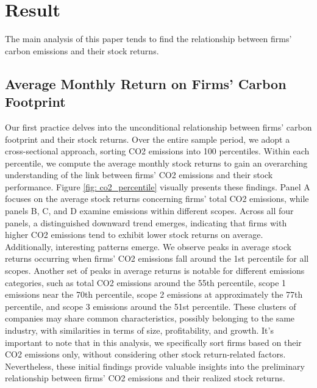 \documentclass[12pt]{article}
\begin{document}
\section{Result} \label{sec:result}
The main analysis of this paper tends to find the relationship between firms' carbon emissions and their stock returns. 
\subsection{Average Monthly Return on Firms' Carbon Footprint}

Our first practice delves into the unconditional relationship between firms' carbon footprint and their stock returns. Over the entire sample period, we adopt a cross-sectional approach, sorting CO2 emissions into 100 percentiles. Within each percentile, we compute the average monthly stock returns to gain an overarching understanding of the link between firms' CO2 emissions and their stock performance. Figure \ref{fig: co2_percentile} visually presents these findings. Panel A focuses on the average stock returns concerning firms' total CO2 emissions, while panels B, C, and D examine emissions within different scopes. Across all four panels, a distinguished downward trend emerges, indicating that firms with higher CO2 emissions tend to exhibit lower stock returns on average. Additionally, interesting patterns emerge. We observe peaks in average stock returns occurring when firms' CO2 emissions fall around the 1st percentile for all scopes. Another set of peaks in average returns is notable for different emissions categories, such as total CO2 emissions around the 55th percentile, scope 1 emissions near the 70th percentile, scope 2 emissions at approximately the 77th percentile, and scope 3 emissions around the 51st percentile. These clusters of companies may share common characteristics, possibly belonging to the same industry, with similarities in terms of size, profitability, and growth. It's important to note that in this analysis, we specifically sort firms based on their CO2 emissions only, without considering other stock return-related factors. Nevertheless, these initial findings provide valuable insights into the preliminary relationship between firms' CO2 emissions and their realized stock returns.
\end{document}
